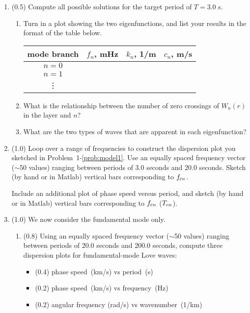 \documentclass[11pt,titlepage,fleqn]{article}
\begin{document}
\begin{enumerate}

\item (0.5) Compute all possible solutions for the target period of $T = 3.0$ s.
%
\begin{enumerate}
\item Turn in a plot showing the two eigenfunctions, and list your results in the format of the table below. \\

\begin{spacing}{1.5}
\begin{tabular}{c|c|c|c}
\hline\hline
mode branch & $f_n$, mHz & $k_n$, 1/m & $c_n$, m/s \\ \hline\hline
$n=0$ & \hspace{2cm} & \hspace{2cm} & \hspace{2cm} \\ \hline
$n=1$ & & & \\ \hline
\vdots & & & \\ \hline
\end{tabular}
\end{spacing}

\item What is the relationship between the number of zero crossings of $W_n(r)$ in the layer and $n$?
\item What are the two types of waves that are apparent in each eigenfunction?
\end{enumerate}


\item (1.0) Loop over a range of frequencies to construct the dispersion plot you sketched in Problem~1-\ref{prob:model1}. Use an equally spaced frequency vector ($\sim$50 values) ranging between periods of 3.0 seconds and 20.0 seconds. Sketch (by hand or in Matlab) vertical bars corresponding to $f_{{\rm c}n}$.

Include an additional plot of phase speed versus period, and sketch (by hand or in Matlab) vertical bars corresponding to $f_{{\rm c}n}$ ($T_{{\rm c}n}$).


\item (1.0) We now consider the fundamental mode only.

\begin{enumerate}
\item (0.8) Using an equally spaced frequency vector ($\sim$50 values) ranging between periods of 20.0 seconds and 200.0 seconds, compute three dispersion plots for fundamental-mode Love waves:
%
\begin{itemize}
\item (0.4) phase speed~(km/s) vs period~(s)
\item (0.2) phase speed~(km/s) vs frequency~(Hz)
\item (0.2) angular frequency (rad/s) vs wavenumber~(1/km)
\end{itemize}


\end{enumerate}
\end{enumerate}
\end{document}
